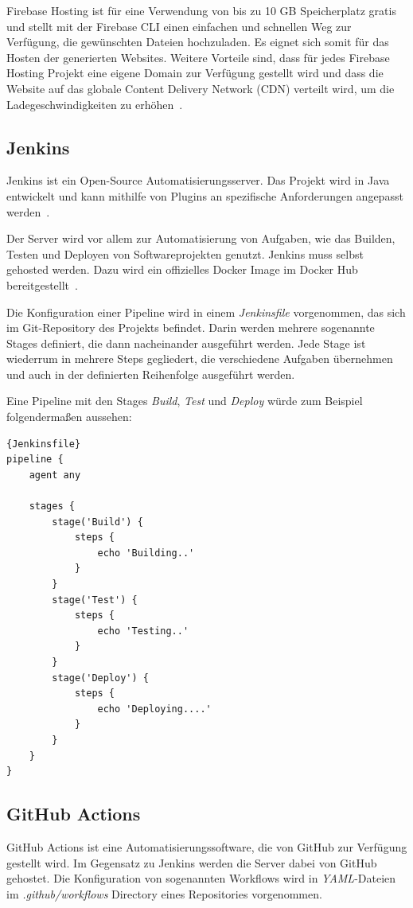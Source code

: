 Firebase Hosting ist für eine Verwendung von bis zu 10 GB Speicherplatz gratis~\cite{firebase-pricing}
und stellt mit der Firebase CLI einen einfachen und schnellen Weg zur Verfügung, die gewünschten
Dateien hochzuladen.
Es eignet sich somit für das Hosten der generierten Websites. Weitere Vorteile sind, dass für jedes Firebase
Hosting Projekt eine eigene Domain zur Verfügung gestellt
wird und dass die Website auf das globale Content Delivery Network (CDN) verteilt wird, um
die Ladegeschwindigkeiten zu erhöhen~\cite{firebase-hosting}.

\subsection{Jenkins}
Jenkins ist ein Open-Source Automatisierungsserver.
Das Projekt wird in Java entwickelt und kann mithilfe von Plugins an spezifische Anforderungen
angepasst werden~\cite{jenkins-github}.

Der Server wird vor allem zur Automatisierung von Aufgaben, wie das Builden,
Testen und Deployen von Softwareprojekten genutzt.
Jenkins muss selbst gehosted werden.
 Dazu wird ein offizielles Docker Image im Docker Hub bereitgestellt~\cite{jenkins-dockerhub}.

Die Konfiguration einer Pipeline wird in einem \textit{Jenkinsfile} vorgenommen,
das sich im Git-Repository des Projekts befindet.
 Darin werden mehrere sogenannte Stages definiert, die dann nacheinander ausgeführt werden.
 Jede Stage ist wiederrum in mehrere Steps gegliedert, die verschiedene Aufgaben übernehmen und auch in der
definierten Reihenfolge ausgeführt werden.

Eine Pipeline mit den Stages \textit{Build}, \textit{Test} und \textit{Deploy} würde
zum Beispiel folgendermaßen aussehen: ~\cite{jenkins-jenkinsfile}

\begin{lstlisting}[label={lst:Jenkinsfile}]{Jenkinsfile}
pipeline {
    agent any

    stages {
        stage('Build') {
            steps {
                echo 'Building..'
            }
        }
        stage('Test') {
            steps {
                echo 'Testing..'
            }
        }
        stage('Deploy') {
            steps {
                echo 'Deploying....'
            }
        }
    }
}
\end{lstlisting}

\subsection{GitHub Actions}
GitHub Actions ist eine Automatisierungssoftware, die von GitHub zur Verfügung
gestellt wird.
Im Gegensatz zu Jenkins werden die Server dabei von GitHub gehostet.
Die Konfiguration von sogenannten Workflows wird in \textit{YAML}-Dateien im
\textit{.github/workflows} Directory eines Repositories vorgenommen.

